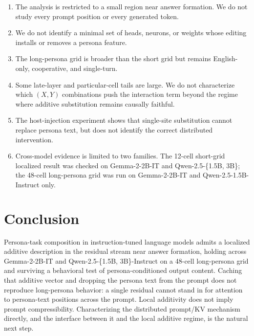 \documentclass[11pt]{article}
\begin{document}
\begin{enumerate}
    \item The analysis is restricted to a small region near answer formation. We do not study every prompt position or every generated token.
    \item We do not identify a minimal set of heads, neurons, or weights whose editing installs or removes a persona feature.
    \item The long-persona grid is broader than the short grid but remains English-only, cooperative, and single-turn.
    \item Some late-layer and particular-cell tails are large. We do not characterize which $(X,Y)$ combinations push the interaction term beyond the regime where additive substitution remains causally faithful.
    \item The host-injection experiment shows that single-site substitution cannot replace persona text, but does not identify the correct distributed intervention.
    \item Cross-model evidence is limited to two families. The 12-cell short-grid localized result was checked on Gemma-2-2B-IT and Qwen-2.5-\{1.5B, 3B\}; the 48-cell long-persona grid was run on Gemma-2-2B-IT and Qwen-2.5-1.5B-Instruct only.
\end{enumerate}

\section{Conclusion}

Persona-task composition in instruction-tuned language models admits a localized additive description in the residual stream near answer formation, holding across Gemma-2-2B-IT and Qwen-2.5-\{1.5B, 3B\}-Instruct on a 48-cell long-persona grid and surviving a behavioral test of persona-conditioned output content. Caching that additive vector and dropping the persona text from the prompt does not reproduce long-persona behavior: a single residual cannot stand in for attention to persona-text positions across the prompt. Local additivity does not imply prompt compressibility. Characterizing the distributed prompt/KV mechanism directly, and the interface between it and the local additive regime, is the natural next step.
\end{document}
